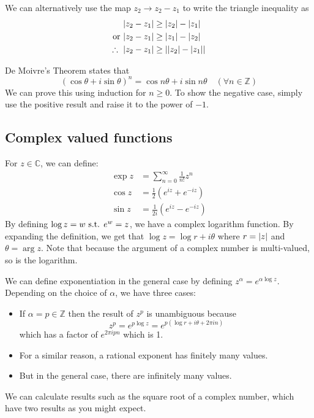 We can alternatively use the map \(z_2 \to z_2 - z_1\) to write the triangle inequality as
\begin{align*}
	\abs{z_2 - z_1}            & \geq \abs{z_2} - \abs{z_1}       \\
	\text{or } \abs{z_2 - z_1} & \geq \abs{z_1} - \abs{z_2}       \\
	\therefore\ \abs{z_2 - z_1} & \geq \abs{\abs{z_2} - \abs{z_1}} \\
\end{align*}

De Moivre's Theorem states that
\[
	(\cos \theta + i \sin \theta)^n = \cos n \theta + i \sin n \theta \quad(\forall n \in \mathbb Z)
\]
We can prove this using induction for \(n \geq 0\).
To show the negative case, simply use the positive result and raise it to the power of \(-1\).

\subsection{Complex valued functions}
For \(z \in \mathbb C\), we can define:
\begin{align*}
	\exp z & = \sum_{n=0}^{\infty} \frac{1}{n!}z^n          \\
	\cos z & = \frac{1}{2} \left( e^{iz} + e^{-iz} \right)  \\
	\sin z & = \frac{1}{2i} \left( e^{iz} - e^{-iz} \right)
\end{align*}
By defining \(\log z = w \text{ s.t. } e^w = z\), we have a complex logarithm function.
By expanding the definition, we get that \(\log z = \log r + i\theta\) where \(r = \abs{z}\) and \(\theta = \arg{z}\).
Note that because the argument of a complex number is multi-valued, so is the logarithm.

We can define exponentiation in the general case by defining \(z^\alpha = e^{\alpha \log z}\).
Depending on the choice of \(\alpha\), we have three cases:
\begin{itemize}
	\item If \(\alpha = p \in \mathbb Z\) then the result of \(z^p\) is unambiguous because
	      \[
		      z^p = e^{p \log z} = e^{p (\log r + i \theta + 2 \pi i n)}
	      \]
	      which has a factor of \(e^{2 \pi i p n}\) which is 1.
	\item For a similar reason, a rational exponent has finitely many values.
	\item But in the general case, there are infinitely many values.
\end{itemize}
We can calculate results such as the square root of a complex number, which have two results as you might expect.

